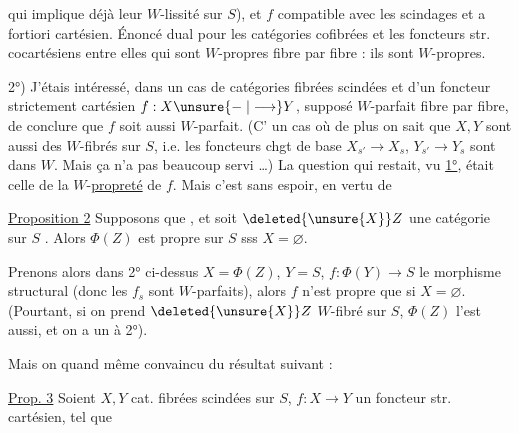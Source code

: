 qui implique déjà leur $W$-lissité sur $S$), et $f$ compatible avec les scindages et a fortiori cartésien. Énoncé dual pour les catégories cofibrées  et les foncteurs str. cocartésiens entre elles qui sont $W$-propres fibre par fibre : ils sont $W$-propres.

2°) J'étais intéressé, dans un cas de catégories fibrées scindées  et d'un foncteur strictement cartésien $f:X\unsure{\relbar|\longrightarrow}Y$, supposé $W$-parfait fibre par fibre, de conclure que $f$ soit aussi $W$-parfait.  (C' un cas où de plus on sait  que
$X,Y$ sont aussi des $W$-fibrés sur $S$, i.e. les foncteurs chgt de base $X_{s'}\longrightarrow X_s$, $Y_{s'}\longrightarrow Y_s$ sont dans $W$. Mais ça n'a pas beaucoup servi \ldots) La question qui restait, vu \uline{1°}, était celle de la $W$-\uline{propreté} de $f$. Mais c'est sans espoir,  en vertu de  

\uline{Proposition 2} Supposons que
, et soit $\deleted{\unsure{X}}Z$ une catégorie sur $S$ . Alors $\Phi(Z)$ est propre sur $S$ sss $X=\varnothing$.

Prenons alors dans 2° ci-dessus $X=\Phi(Z)$, $Y=S$, $f:\Phi(Y)\longrightarrow S$ le morphisme structural (donc les $f_s$ sont $W$-parfaits), alors $f$ n'est propre que si $X=\varnothing$. (Pourtant, si on prend $\deleted{\unsure{X}}Z$ $W$-fibré sur $S$, $\Phi(Z)$ l'est aussi, et on a un  à 2°).

Mais on  quand même convaincu du résultat suivant :

\uline{Prop. 3} Soient $X,Y$ cat. fibrées scindées sur $S$, $f:X\longrightarrow Y$ un foncteur str. cartésien, tel que

